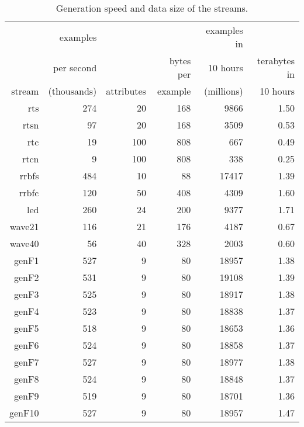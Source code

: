 \begin{table}
\caption{Generation speed and data size of the streams.}
\centering
\begin{tabular}{|r|r|r|r|r|r|}
\hline		
	&	examples	&		&		&	examples in	&		\\
	&	per second	&		&	bytes per	&	10 hours	&	terabytes in	\\
stream	&	(thousands)	&	attributes	&	example	&	(millions)	&	10 hours	\\
\hline											
{\sc rts}	&	274	&	20	&	168	&	9866	&	1.50	\\
{\sc rtsn}	&	97	&	20	&	168	&	3509	&	0.53	\\
{\sc rtc	}&	19	&	100	&	808	&	667	&	0.49	\\
{\sc rtcn}	&	9	&	100	&	808	&	338	&	0.25	\\
{\sc rrbfs}	&	484	&	10	&	88	&	17417	&	1.39	\\
{\sc rrbfc}	&	120	&	50	&	408	&	4309	&	1.60	\\
{\sc led	}&	260	&	24	&	200	&	9377	&	1.71	\\
{\sc wave21}	&	116	&	21	&	176	&	4187	&	0.67	\\
{\sc wave40}	&	56	&	40	&	328	&	2003	&	0.60	\\
{\sc genF1}	&	527	&	9	&	80	&	18957	&	1.38	\\
{\sc genF2}	&	531	&	9	&	80	&	19108	&	1.39	\\
{\sc genF3}	&	525	&	9	&	80	&	18917	&	1.38	\\
{\sc genF4}	&	523	&	9	&	80	&	18838	&	1.37	\\
{\sc genF5}	&	518	&	9	&	80	&	18653	&	1.36	\\
{\sc genF6}	&	524	&	9	&	80	&	18858	&	1.37	\\
{\sc genF7}	&	527	&	9	&	80	&	18977	&	1.38	\\
{\sc genF8}	&	524	&	9	&	80	&	18848	&	1.37	\\
{\sc genF9}	&	519	&	9	&	80	&	18701	&	1.36	\\
{\sc genF10}	&	527	&	9	&	80	&	18957	&	1.47	\\
\hline											
\end{tabular}
\label{tab:dsspeeds}
\end{table}


